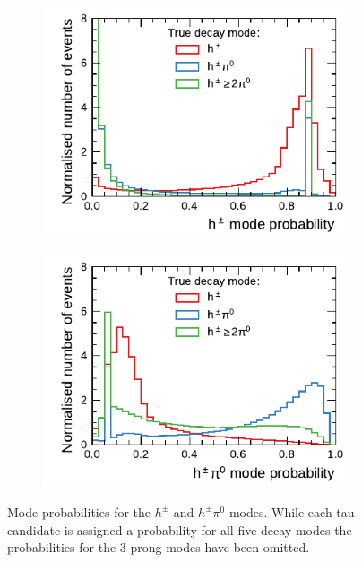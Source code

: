 \begin{figure}[ht]
  \begin{subfigure}[t]{0.48\textwidth}
    \centering
    \includegraphics{./figures/decay_mode_classification/mode_proba_baseline_ptcut_1_5_only_1p/proba_1p0n.pdf}
  \end{subfigure}\hfill
  \begin{subfigure}[t]{0.48\textwidth}
    \centering
    \includegraphics{./figures/decay_mode_classification/mode_proba_baseline_ptcut_1_5_only_1p/proba_1p1n.pdf}
  \end{subfigure}
  \caption{Mode probabilities for the $h^\pm$ and $h^\pm \pi^0$ modes. While
    each tau candidate is assigned a probability for all five decay modes the
    probabilities for the 3-prong modes have been omitted.}
  \label{fig:mode_proba_ptcut}
\end{figure}

